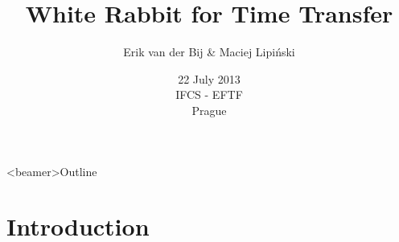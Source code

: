 \documentclass[compress,red]{beamer}
\title[White Rabbit for Time Transfer \hspace{2em}\insertframenumber/\inserttotalframenumber]
{White Rabbit for Time Transfer}
\institute{
   \begin{center}
    Hardware and Timing Section  \\
    CERN\\
   \end{center}
}
\author{
Erik van der Bij \& Maciej Lipi\'{n}ski 
}
\date{22 July 2013 \\ IFCS - EFTF\\Prague}
\begin{document}
\frame{\titlepage}
\begin{frame}<beamer>{Outline}
    \tableofcontents %
\end{frame}

\section{Introduction}
\subsection{}
\end{document}
